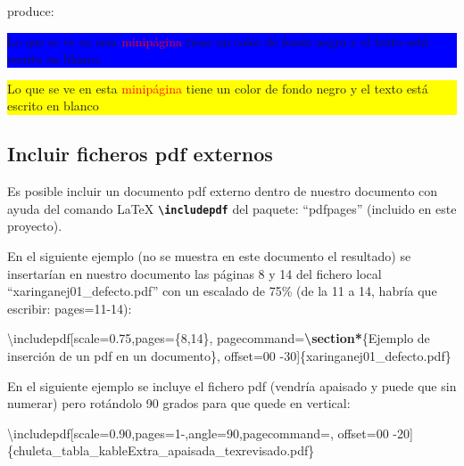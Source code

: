 \documentclass[12pt,a4paper,]{book}
\newenvironment{Shaded}{\begin{snugshade}}{\end{snugshade}}
\newcommand{\FunctionTok}[1]{\textcolor[rgb]{0.00,0.00,0.00}{#1}}
\newcommand{\KeywordTok}[1]{\textcolor[rgb]{0.13,0.29,0.53}{\textbf{#1}}}
\newcommand{\NormalTok}[1]{#1}
\numberwithin{dummy}{section}
\theoremstyle{ocrenumbox}
\theoremstyle{blacknumex}
\theoremstyle{blacknumbox}
\theoremstyle{ocrenum}
\theoremstyle{ocrenum}
\begin{document}
produce:

\noindent

\colorbox{blue}{
\begin{minipage}{0.30\textwidth}
\color{white}
Lo que se ve en esta \textcolor{red}{minipágina} 
tiene un color de fondo negro y
el texto está escrito en blanco. 
\end{minipage}}\hspace{0.5cm} 
\colorbox{yellow}{\begin{minipage}{0.60\textwidth} 
Lo que se ve en esta \textcolor{red}{minipágina} 
tiene un color de fondo negro y
el texto está escrito en blanco
\end{minipage}}

\texttt{}

\hypertarget{incluir-ficheros-pdf-externos}{%
\subsection{Incluir ficheros pdf
externos}\label{incluir-ficheros-pdf-externos}}

Es posible incluir un documento pdf externo dentro de nuestro documento
con ayuda del comando LaTeX \textbf{\texttt{\textbackslash{}includepdf}}
del paquete: ``pdfpages'' (incluido en este proyecto).

En el siguiente ejemplo (no se muestra en este documento el resultado)
se insertarían en nuestro documento las páginas 8 y 14 del fichero local
``xaringanej01\_defecto.pdf'' con un escalado de 75\% (de la 11 a 14,
habría que escribir: pages=11-14):

\begin{Shaded}
\begin{Highlighting}[]
\FunctionTok{\textbackslash{}includepdf}\NormalTok{[scale=0.75,pages=\{8,14\}, }
\NormalTok{  pagecommand=}\KeywordTok{\textbackslash{}section*}\NormalTok{\{Ejemplo de inserción de un pdf en un documento\}, }
\NormalTok{  offset=00 {-}30]\{xaringanej01\_defecto.pdf\}}
\end{Highlighting}
\end{Shaded}

En el siguiente ejemplo se incluye el fichero pdf (vendría apaisado y
puede que sin numerar) pero rotándolo 90 grados para que quede en
vertical:

\begin{Shaded}
\begin{Highlighting}[]
\FunctionTok{\textbackslash{}includepdf}\NormalTok{[scale=0.90,pages=1{-},angle=90,pagecommand=,}
\NormalTok{offset=00 {-}20]\{chuleta\_tabla\_kableExtra\_apaisada\_texrevisado.pdf\}}
\end{Highlighting}
\end{Shaded}
\end{document}
